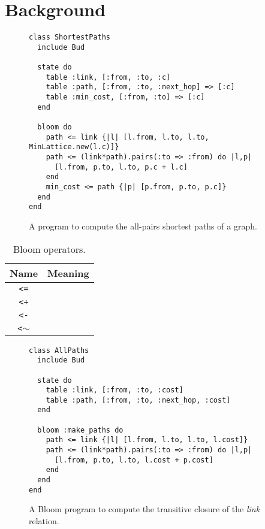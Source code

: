 \section{Background}
\label{sec:background}
\begin{figure}[t]
\begin{scriptsize}
\begin{lstlisting}
class ShortestPaths
  include Bud

  state do
    table :link, [:from, :to, :c]
    table :path, [:from, :to, :next_hop] => [:c]
    table :min_cost, [:from, :to] => [:c]
  end

  bloom do
    path <= link {|l| [l.from, l.to, l.to, MinLattice.new(l.c)]}
    path <= (link*path).pairs(:to => :from) do |l,p|
      [l.from, p.to, l.to, p.c + l.c]
    end
    min_cost <= path {|p| [p.from, p.to, p.c]}
  end
end
\end{lstlisting}
\end{scriptsize}
\caption{A \lang program to compute the all-pairs shortest paths of a
  graph.}
\label{fig:lattice-spaths}
\end{figure}

\begin{table}
\begin{tabular}{|c|l|}
\hline
\textbf{Name} & \textbf{Meaning} \\
\hline
\verb|<=| &  \\
\hline
\verb|<+| &  \\
\hline
\verb|<-| &  \\
\hline
\verb|<|$\sim$ &  \\
\hline
\end{tabular}
\caption{Bloom operators.}
\label{tbl:bloom-ops}
\end{table}

\begin{figure}[t]
\begin{scriptsize}
\begin{lstlisting}
class AllPaths
  include Bud

  state do
    table :link, [:from, :to, :cost]
    table :path, [:from, :to, :next_hop, :cost]
  end

  bloom :make_paths do
    path <= link {|l| [l.from, l.to, l.to, l.cost]}
    path <= (link*path).pairs(:to => :from) do |l,p|
      [l.from, p.to, l.to, l.cost + p.cost]
    end
  end
end
\end{lstlisting}
\end{scriptsize}
\caption{A Bloom program to compute the transitive closure of the
  \emph{link} relation.}
\label{fig:bloom-spaths}
\end{figure}

